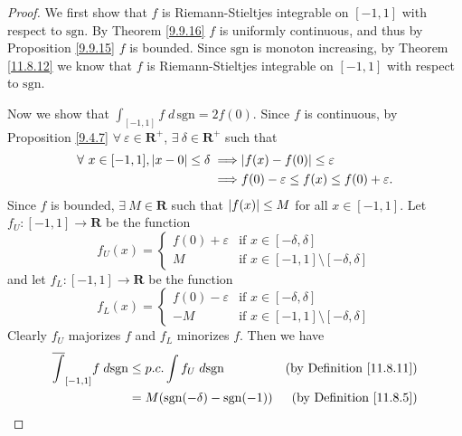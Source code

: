 \begin{proof}
    We first show that \(f\) is Riemann-Stieltjes integrable on \([-1, 1]\) with respect to \(\text{sgn}\).
    By Theorem \ref{9.9.16} \(f\) is uniformly continuous, and thus by Proposition \ref{9.9.15} \(f\) is bounded.
    Since \(\text{sgn}\) is monoton increasing, by Theorem \ref{11.8.12} we know that \(f\) is Riemann-Stieltjes integrable on \([-1, 1]\) with respect to \(\text{sgn}\).

    Now we show that \(\int_{[-1, 1]} f \; d \, \text{sgn} = 2f(0)\).
    Since \(f\) is continuous, by Proposition \ref{9.4.7} \(\forall\ \varepsilon \in \mathbf{R}^+\), \(\exists\ \delta \in \mathbf{R}^+\) such that
    \begin{align*}
        \forall\ x \in [-1, 1], \abs*{x - 0} \leq \delta \implies & \abs*{f(x) - f(0)} \leq \varepsilon                   \\
        \implies                                                  & f(0) - \varepsilon \leq f(x) \leq f(0) + \varepsilon.
    \end{align*}
    Since \(f\) is bounded, \(\exists\ M \in \mathbf{R}\) such that \(\abs*{f(x)} \leq M\) for all \(x \in [-1, 1]\).
    Let \(f_U : [-1, 1] \to \mathbf{R}\) be the function
    \[
        f_U(x) = \begin{cases}
            f(0) + \varepsilon & \text{if } x \in [-\delta, \delta]                   \\
            M                  & \text{if } x \in [-1, 1] \setminus [-\delta, \delta]
        \end{cases}
    \]
    and let \(f_L : [-1, 1] \to \mathbf{R}\) be the function
    \[
        f_L(x) = \begin{cases}
            f(0) - \varepsilon & \text{if } x \in [-\delta, \delta]                   \\
            -M                 & \text{if } x \in [-1, 1] \setminus [-\delta, \delta]
        \end{cases}
    \]
    Clearly \(f_U\) majorizes \(f\) and \(f_L\) minorizes \(f\).
    Then we have
    \begin{align*}
        \overline{\int}_{[-1, 1]} f \; d \text{sgn} & \leq p.c. \int f_U \; d \text{sgn}                                & \text{(by Definition \ref{11.8.11})} \\
                                                    & = M (\text{sgn}(-\delta) - \text{sgn}(-1))                        & \text{(by Definition \ref{11.8.5})}  \\

\end{align*}
\end{proof}
